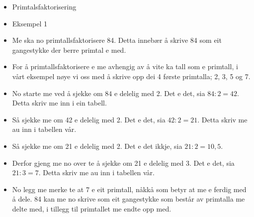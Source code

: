 


\begin{itemize}
	\item Primtalsfaktorisering
	\item Eksempel 1
	\item Me ska no primtallsfaktorisere 84. Detta innebær å skrive 84 som eit gangestykke der berre primtal e med.
	\item For å primtallsfaktorisere e me avhengig av å vite ka tall som e primtall, i vårt eksempel nøye vi oss med å skrive opp dei 4 første primtalla; 2, 3, 5 og 7. 
	\item No starte me ved å sjekke om $ 84 $ e delelig med 2. Det e det, sia $ 84:2 = 42 $. Detta skriv me inn i ein tabell.
	\item Så sjekke me om 42 e delelig med 2. Det e det, sia $ 42:2=21 $. Detta skriv me au inn i tabellen vår. 
	\item Så sjekke me om 21 e delelig med 2. Det e det ikkje, sia $ 21:2 =10,5$. 
	\item Derfor gjeng me no over te å sjekke om 21 e delelig med 3. Det e det, sia $ 21:3=7 $. Detta skriv me au inn i tabellen vår.
	\item No legg me merke te at 7 e eit primtall, nåkkå som betyr at me e ferdig med å dele. 84 kan me no skrive som eit gangestykke som består av primtalla me delte med, i tillegg til primtallet me endte opp med.
\end{itemize}

